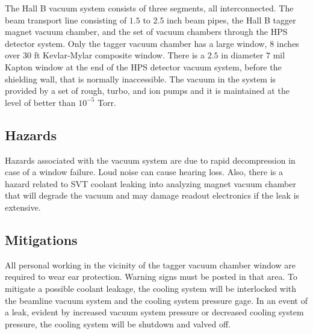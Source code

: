 

The Hall B vacuum system consists of three segments, all interconnected. The beam transport line consisting of $1.5$ to $2.5$ inch beam pipes, the Hall B tagger magnet vacuum chamber, and the set of vacuum chambers through the HPS detector system. Only the tagger vacuum chamber has a large window, $8$ inches over $30$ ft Kevlar-Mylar composite window. There is a $2.5$ in diameter $7$ mil Kapton window at the end of the HPS detector vacuum system, before the shielding wall, that is normally inaccessible. The vacuum in the system is provided by a set of rough, turbo, and ion pumps and it is maintained at the level of better than $10^{-5}$ Torr. 

\subsection{Hazards} 

\indent

Hazards associated with the vacuum system are due to rapid decompression in case of a window failure. Loud noise can cause hearing loss. Also, there is a hazard related to SVT coolant leaking into analyzing magnet vacuum chamber that will degrade the vacuum and may damage readout electronics if the leak is extensive.

\subsection{Mitigations}

\indent

All personal working in the vicinity of the tagger vacuum chamber window are required to wear ear protection. Warning signs must be posted in that area. To mitigate a possible coolant leakage, the cooling system will be interlocked with the beamline vacuum system and the cooling system pressure gage. In an event of a leak, evident by increased vacuum system pressure or decreased cooling system pressure, the cooling system will be shutdown and valved off. 



